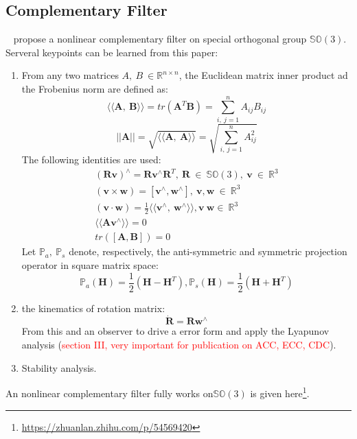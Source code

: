 \documentclass[a4paper]{report}
\begin{document}
\subsection{Complementary Filter}
~\cite{mahony2008nonlinear} propose a nonlinear complementary filter on special orthogonal group $\mathbb{SO}(3)$. 
Serveral keypoints can be learned from this paper:
\begin{enumerate}
	\item From any two matrices $A,\ B\ \in \mathbb{R}^{n\times n}$, the Euclidean matrix inner product ad the Frobenius norm are defined as:
	$$
	\langle\langle \mathbf{A},\ \mathbf{B} \rangle\rangle=tr(\mathbf{A}^{T}\mathbf{B})=\sum_{i,\ j=1}^{n}A_{ij}B_{ij}
	$$
	$$
	||\mathbf{A}||=\sqrt{\langle\langle \mathbf{A},\ \mathbf{A} \rangle\rangle}=\sqrt{\sum_{i,\ j=1}^{n}A^2_{ij}}
	$$
	The following identities are used:
	\begin{align}
	(\mathbf{Rv})^{\wedge}=\mathbf{R}\mathbf{v}^{\wedge}\mathbf{R}^T,\ \mathbf{R}\ \in\ \mathbb{SO}(3),\ \mathbf{v}\ \in\ \mathbb{R}^{3} \\
	(\mathbf{v} \times \mathbf{w})=[\mathbf{v}^{\wedge}, \mathbf{w}^{\wedge}],\ \mathbf{v, w}\ \in\ \mathbb{R}^{3} \\
	(\mathbf{v} \cdot \mathbf{w})=\frac{1}{2}\langle\langle \mathbf{v}^{\wedge},\ \mathbf{w}^{\wedge} \rangle\rangle, \mathbf{v}\ \mathbf{w} \in\ \mathbb{R}^{3} \\
	\langle\langle \mathbf{A}\mathbf{v}^{\wedge}  \rangle\rangle =0 \\
	tr([\mathbf{A},\mathbf{B}])=0
	\end{align}
	Let $\mathbb{P}_{a},\ \mathbb{P}_{s}$ denote, respectively, the anti-symmetric and symmetric projection operator in square matrix space:
	$$
	\mathbb{P}_{a}(\mathbf{H})=\frac{1}{2}(\mathbf{H}-\mathbf{H}^T), \mathbb{P}_{s}(\mathbf{H})=\frac{1}{2}(\mathbf{H}+\mathbf{H}^T)
	$$
	\item the kinematics of rotation matrix:
	$$
	\dot{\mathbf{R}}=\mathbf{R}\mathbf{w}^{\wedge}
	$$
	From this and an observer to drive a error form and apply the Lyapunov analysis (\textcolor{red}{section III, very important for publication on ACC, ECC, CDC}).
	\item Stability analysis.
\end{enumerate}
An nonlinear complementary filter fully works on$\mathbb{SO}(3)$ is given here\footnote{\url{https://zhuanlan.zhihu.com/p/54569420}}.


%


\end{document}
